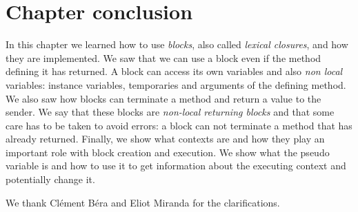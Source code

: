 \documentclass[a4paper,10pt,twoside]{book}
\begin{document}
\section{Chapter conclusion}



In this chapter we learned how to use \emph{blocks}, also called
\emph{lexical closures}, and how they are implemented. We saw that we can use
a block even if the method defining it has returned. A block can
access its own variables and also \emph{non local} variables: instance
variables, temporaries and arguments of the defining method. We also
saw how blocks can terminate a method and return a value to the
sender. We say that these blocks are \emph{non-local returning blocks}
and that some care has to be taken to avoid errors: a block can not
terminate a method that has already returned. Finally, we show
what contexts are and how they play an important role with block creation and execution.
We show what the  pseudo variable is and how to use it to get
information about the executing context and potentially change it.

We thank Cl\'ement B\'era and Eliot Miranda for the clarifications.
\ifx\wholebook\relax\else
   
   
\end{document}
